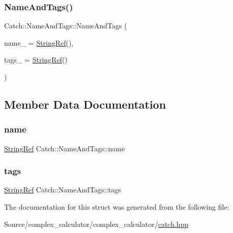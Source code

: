 \subsubsection{\texorpdfstring{Name\+And\+Tags()}{NameAndTags()}}
{\footnotesize\ttfamily Catch\+::\+Name\+And\+Tags\+::\+Name\+And\+Tags (\begin{DoxyParamCaption}\item[{\mbox{\hyperlink{class_catch_1_1_string_ref}{String\+Ref}} const \&}]{name\+\_\+ = {\ttfamily \mbox{\hyperlink{class_catch_1_1_string_ref}{String\+Ref}}()},  }\item[{\mbox{\hyperlink{class_catch_1_1_string_ref}{String\+Ref}} const \&}]{tags\+\_\+ = {\ttfamily \mbox{\hyperlink{class_catch_1_1_string_ref}{String\+Ref}}()} }\end{DoxyParamCaption})\hspace{0.3cm}{\ttfamily [noexcept]}}



\subsection{Member Data Documentation}
\mbox{\label{struct_catch_1_1_name_and_tags_a7cbea60e0cebfa622c667008eb011420}} 
\subsubsection{\texorpdfstring{name}{name}}
{\footnotesize\ttfamily \mbox{\hyperlink{class_catch_1_1_string_ref}{String\+Ref}} Catch\+::\+Name\+And\+Tags\+::name}

\mbox{\label{struct_catch_1_1_name_and_tags_a74062ed1138834a348424eb7ed900c57}} 
\subsubsection{\texorpdfstring{tags}{tags}}
{\footnotesize\ttfamily \mbox{\hyperlink{class_catch_1_1_string_ref}{String\+Ref}} Catch\+::\+Name\+And\+Tags\+::tags}



The documentation for this struct was generated from the following file\+:\begin{DoxyCompactItemize}
\item 
Source/complex\+\_\+calculator/complex\+\_\+calculator/\mbox{\hyperlink{catch_8hpp}{catch.\+hpp}}\end{DoxyCompactItemize}
